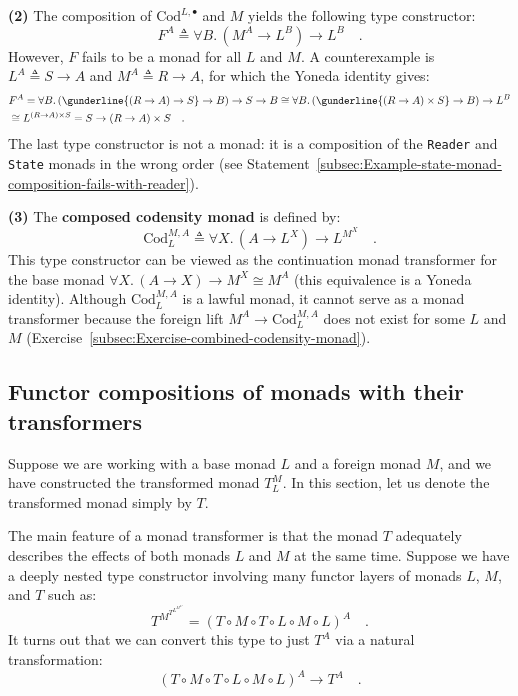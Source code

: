 \textbf{(2)} The composition of $\text{Cod}^{L,\bullet}$ and $M$
yields the following type constructor:
\[
F^{A}\triangleq\forall B.\,(M^{A}\rightarrow L^{B})\rightarrow L^{B}\quad.
\]
However, $F$ fails to be a monad for all $L$ and $M$. A counterexample
is $L^{A}\triangleq S\rightarrow A$ and $M^{A}\triangleq R\rightarrow A$,
for which the Yoneda identity gives:
\begin{align*}
 & F^{A}=\forall B.\,(\gunderline{(R\rightarrow A)\rightarrow S}\rightarrow B)\rightarrow S\rightarrow B\cong\forall B.\,(\gunderline{(R\rightarrow A)\times S}\rightarrow B)\rightarrow L^{B}\\
 & \cong L^{(R\rightarrow A)\times S}=S\rightarrow\left(R\rightarrow A\right)\times S\quad.
\end{align*}
The last type constructor is not a monad: it is a composition of the
\lstinline!Reader! and \lstinline!State! monads in the wrong order
(see Statement~\ref{subsec:Example-state-monad-composition-fails-with-reader}).

\textbf{(3)} The \textbf{composed codensity monad}
is defined by:
\[
\text{Cod}_{L}^{M,A}\triangleq\forall X.\,(A\rightarrow L^{X})\rightarrow L^{M^{X}}\quad.
\]
This type constructor can be viewed as the continuation monad transformer
for the base monad $\forall X.\,(A\rightarrow X)\rightarrow M^{X}\cong M^{A}$
(this equivalence is a Yoneda identity). Although $\text{Cod}_{L}^{M,A}$
is a lawful monad, it cannot serve as a monad transformer because
the foreign lift $M^{A}\rightarrow\text{Cod}_{L}^{M,A}$ does not
exist for some $L$ and $M$ (Exercise~\ref{subsec:Exercise-combined-codensity-monad}).

\subsection{Functor compositions of monads with their transformers}

Suppose we are working with a base monad $L$ and a foreign monad
$M$, and we have constructed the transformed monad $T_{L}^{M}$.
In this section, let us denote the transformed monad simply by $T$. 

The main feature of a monad transformer is that the monad $T$ adequately
describes the effects of both monads $L$ and $M$ at the same time.
Suppose we have a deeply nested type constructor involving many functor
layers of monads $L$, $M$, and $T$ such as:
\[
T^{M^{T^{L^{M^{L^{A}}}}}}=\left(T\circ M\circ T\circ L\circ M\circ L\right)^{A}\quad.
\]
It turns out that we can convert this type to just $T^{A}$ via a
natural transformation:
\[
\left(T\circ M\circ T\circ L\circ M\circ L\right)^{A}\rightarrow T^{A}\quad.
\]

